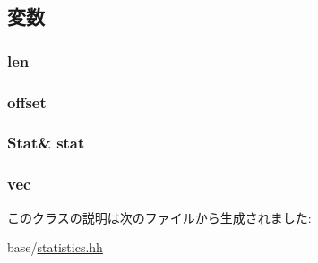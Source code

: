 \subsection{変数}
\hypertarget{classStats_1_1VectorProxy_a5957358d37d75723f57301e98a6c53ce}{
\subsubsection[{len}]{ {\bf len}}}
\label{classStats_1_1VectorProxy_a5957358d37d75723f57301e98a6c53ce}
\hypertarget{classStats_1_1VectorProxy_ae28be34e3b236f2519b5af71539a66d9}{
\subsubsection[{offset}]{ {\bf offset}}}
\label{classStats_1_1VectorProxy_ae28be34e3b236f2519b5af71539a66d9}
\hypertarget{classStats_1_1VectorProxy_a7fee3822515c4dc6b8b99a8bf35fa6b8}{
\subsubsection[{stat}]{\setlength{\rightskip}{0pt plus 5cm}Stat\& {\bf stat}}}
\label{classStats_1_1VectorProxy_a7fee3822515c4dc6b8b99a8bf35fa6b8}
\hypertarget{classStats_1_1VectorProxy_a539785a2cf8aa37d52a6023051f9f797}{
\subsubsection[{vec}]{ {\bf vec}}}
\label{classStats_1_1VectorProxy_a539785a2cf8aa37d52a6023051f9f797}


このクラスの説明は次のファイルから生成されました:\begin{DoxyCompactItemize}
\item 
base/\hyperlink{statistics_8hh}{statistics.hh}\end{DoxyCompactItemize}
